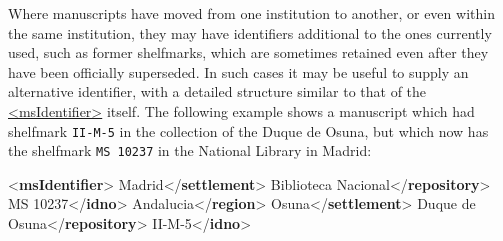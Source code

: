 Where manuscripts have moved from one institution to another, or even within the same institution, they may have identifiers additional to the ones currently used, such as former shelfmarks, which are sometimes retained even after they have been officially superseded. In such cases it may be useful to supply an alternative identifier, with a detailed structure similar to that of the \hyperref[TEI.msIdentifier]{<msIdentifier>} itself. The following example shows a manuscript which had shelfmark \texttt{II-M-5} in the collection of the Duque de Osuna, but which now has the shelfmark \texttt{MS 10237} in the National Library in Madrid: \par\bgroup{}\exampleFont \begin{shaded}\noindent\mbox{}{<\textbf{msIdentifier}>}\mbox{}\newline 
{}Madrid{</\textbf{settlement}>}\mbox{}\newline 
{}Biblioteca Nacional{</\textbf{repository}>}\mbox{}\newline 
{}MS 10237{</\textbf{idno}>}\mbox{}\newline 
{}\mbox{}\newline 
\hspace*{1em}Andalucia{</\textbf{region}>}\mbox{}\newline 
\hspace*{1em}Osuna{</\textbf{settlement}>}\mbox{}\newline 
\hspace*{1em}Duque de Osuna{</\textbf{repository}>}\mbox{}\newline 
\hspace*{1em}II-M-5{</\textbf{idno}>}\mbox{}\newline 

\end{shaded}
